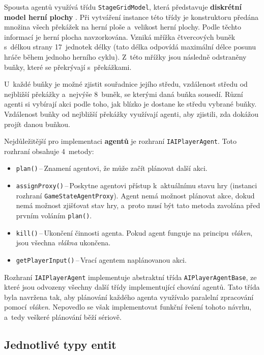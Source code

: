 Spousta agentů využívá třídu \texttt{StageGridModel}, která představuje \textbf{diskrétní model herní plochy} \cite{MIT_OpenCourseWare:Incremental_Path_Planning}. Při vytváření instance této třídy je konstruktoru předána množina všech překážek na herní ploše a~velikost herní plochy. Podle těchto informací je herní plocha navzorkována. Vzniká mřížka čtvercových buněk s~délkou strany 17~jednotek délky (tato délka odpovídá maximální délce posunu hráče během jednoho herního cyklu). Z~této mřížky jsou následně odstraněny buňky, které se překrývají s~překážkami.

U~každé buňky je možné zjistit souřadnice jejího středu, vzdálenost středu od nejbližší překážky a~nejvýše 8~buněk, se kterými daná buňka sousedí. Různí agenti si vybírají akci podle toho, jak blízko je dostane ke středu vybrané buňky. Vzdálenost buňky od nejbližší překážky využívají agenti, aby zjistili, zda dokážou projít danou buňkou.

Nejdůležitější pro implementaci \textbf{agentů} je rozhraní \texttt{IAIPlayerAgent}. Toto rozhraní obsahuje 4~metody:
\begin{itemize}
    \item \texttt{plan()}\,--\,Znamení agentovi, že může začít plánovat další akci.
    \item \texttt{assignProxy()}\,--\,Poskytne agentovi přístup k~aktuálnímu stavu hry (instanci rozhraní \texttt{GameStateAgentProxy}). Agent nemá možnost plánovat akce, dokud nemá možnost zjišťovat stav hry, a~proto musí být tato metoda zavolána před prvním voláním \texttt{plan()}.
    \item \texttt{kill()}\,--\,Ukončení činnosti agenta. Pokud agent funguje na principu \emph{vláken}, jsou všechna \emph{vlákna} ukončena.
    \item \texttt{getPlayerInput()}\,--\,Vrací agentem naplánovanou akci.
\end{itemize}

Rozhraní \texttt{IAIPlayerAgent} implementuje abstraktní třída \texttt{AIPlayerAgentBase}, ze které jsou odvozeny všechny další třídy implementující chování agentů. Tato třída byla navržena tak, aby plánování každého agenta využívalo paralelní zpracování pomocí \emph{vláken}. Nepovedlo se však implementovat funkční řešení tohoto návrhu, a~tedy veškeré plánování běží sériově.


\subsection{Jednotlivé typy entit}

